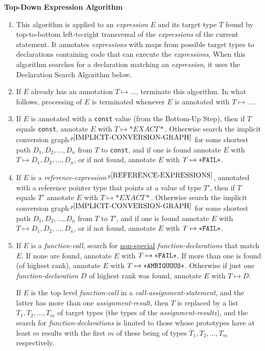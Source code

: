 \documentclass[12pt]{article}
\newcommand{\pagnote}[1]{$\,^{p\pageref{#1}}$}
\begin{document}
\centerline{\bf Top-Down Expression Algorithm}
\begin{enumerate}

\item This algorithm is applied to an {\em expression} $E$ and its
target type $T$ found by
top-to-bottom left-to-right transversal of the {\em expressions} of the
current statement.  It annotates {\em expressions} with maps from
possible target types to declarations containing code that can execute
the {\em expressions},
When this algorithm searches for a declaration matching an {\em expression},
it uses the Declaration Search Algorithm below.

\item If $E$ already has an annotation $T\mapsto \ldots$,
terminate this algorithm.  In what follows, processing of $E$ is
terminated whenever $E$ is annotated with $T\mapsto \ldots$.

\item If $E$ is annotated with a {\tt const} value
(from the Bottom-Up Step), then if $T$ equals {\tt const},
annotate $E$ with $T\mapsto{*EXACT*}$.
Otherwise search the implicit conversion
graph\pagnote{IMPLICIT-CONVERSION-GRAPH}
for some shortest path $D_1,D_2,\ldots,D_n$ from $T$ to {\tt const},
and if one is found annotate $E$ with $T\mapsto D_1,D_2,\ldots,D_n$,
or if not found,
annotate $E$ with $T\mapsto {\tt *FAIL*}$.

\item If $E$ is a
{\em reference-expression}\pagnote{REFERENCE-EXPRESSIONS},
annotated with a reference pointer type that points at a value
of type $T'$,
then if $T$ equals $T'$ annotate $E$ with $T\mapsto{*EXACT*}$.
Otherwise search the implicit conversion
graph\pagnote{IMPLICIT-CONVERSION-GRAPH}
for some shortest path $D_1,D_2,\ldots,D_n$ from $T$ to $T'$,
and if one is found annotate $E$ with $T\mapsto D_1,D_2,\ldots,D_n$,
or if not found,
annotate $E$ with $T\mapsto {\tt *FAIL*}$.

\item If $E$ is a {\em function-call}, search for \underline{non-special}
{\em function-declarations}
that match $E$.
If none are found,
annotate $E$ with $T\mapsto{\tt *FAIL*}$.
If more than one is found (of highest rank),
annotate $E$ with $T\mapsto{\tt *AMBIGUOUS*}$.
Otherwise if just one {\em function-declaration} $D$ of highest rank was found,
annotate $E$ with $T\mapsto D$.

If $E$ is the top level {\em function-call}
in a {\em call-assignment-statement}, and the latter has
more than one {\em assignment-result}, then $T$ is replaced by a list
$T_1,T_2,\ldots,T_m$ of target types (the types of the
{\em assignment-results}), and the search for
{\em function-declarations} is limited to those whose prototypes have
at least $m$ results with the first $m$ of these being of types
$T_1,T_2,\ldots,T_m$ respectively.

\end{enumerate}
\end{document}
